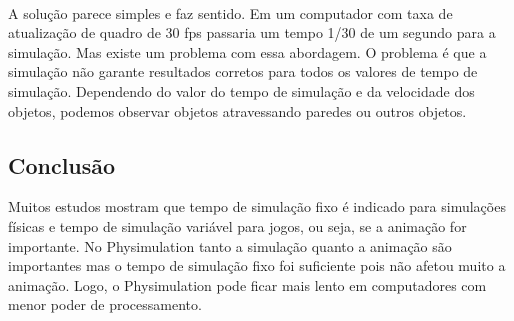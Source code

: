 \ \\
A solução parece simples e faz sentido. Em um computador com taxa de atualização de quadro de 30 fps passaria um tempo 1/30 de um segundo para a simulação.
Mas existe um problema com essa abordagem. O problema é que a simulação não garante resultados corretos para todos os valores de tempo de simulação. 
Dependendo do valor do tempo de simulação e da velocidade dos objetos, podemos observar objetos atravessando paredes ou outros objetos.

\subsection{Conclusão}

Muitos estudos mostram que tempo de simulação fixo é indicado para simulações físicas e tempo de simulação variável para jogos, ou seja, se a animação for 
importante. No Physimulation tanto a simulação quanto a animação são importantes mas o tempo de simulação fixo foi suficiente pois não afetou muito a animação.
Logo, o Physimulation pode ficar mais lento em computadores com menor poder de processamento.
